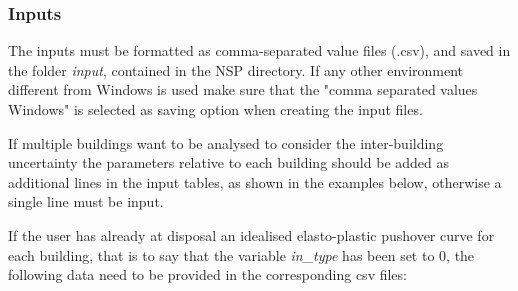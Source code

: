 \subsubsection{Inputs}
\label{subsubsec:InputCr}
The inputs must be formatted as comma-separated value files (.csv), and saved in the folder \textit{input}, contained in the NSP directory. If any other environment different from Windows is used make sure that the "comma separated values Windows" is selected as saving option when creating the input files. 

If multiple buildings want to be analysed to consider the inter-building uncertainty the parameters relative to each building should be added as additional lines in the input tables, as shown in the examples below, otherwise a single line must be input.

If the user has already at disposal an idealised elasto-plastic pushover curve for each building, that is to say that the variable \textit{in\_type} has been set to 0, the following data need to be provided in the corresponding csv files:

